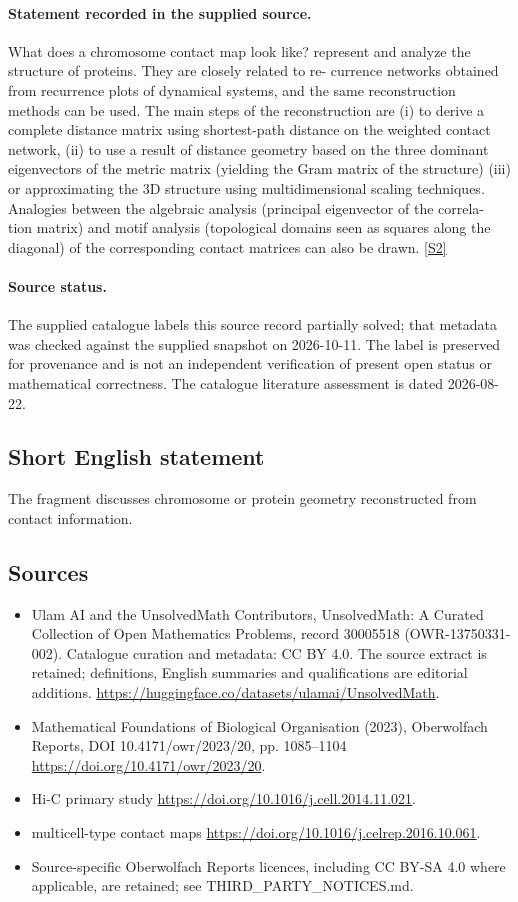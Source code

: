 \documentclass[11pt]{article}
\newcommand{\sref}[2]{\hyperlink{source:#1:#2}{[S#2]}}
\begin{document}
\paragraph{Statement recorded in the supplied source.}
What does a chromosome contact map look like? represent and analyze the structure of proteins. They are closely related to re- currence networks obtained from recurrence plots of dynamical systems, and the same reconstruction methods can be used. The main steps of the reconstruction are (i) to derive a complete distance matrix using shortest-path distance on the weighted contact network, (ii) to use a result of distance geometry based on the three dominant eigenvectors of the metric matrix (yielding the Gram matrix of the structure) (iii) or approximating the 3D structure using multidimensional scaling techniques. Analogies between the algebraic analysis (principal eigenvector of the correla- tion matrix) and motif analysis (topological domains seen as squares along the diagonal) of the corresponding contact matrices can also be drawn. \sref{30005518}{2}
\paragraph{Source status.}
The supplied catalogue labels this source record partially solved; that metadata was checked against the supplied snapshot on 2026-10-11. The label is preserved for provenance and is not an independent verification of present open status or mathematical correctness. The catalogue literature assessment is dated 2026-08-22.
\subsection{Short English statement}
The fragment discusses chromosome or protein geometry reconstructed from contact information.
\subsection{Sources}
\begin{itemize}
\item[\hypertarget{source:30005518:1}{S1}] Ulam AI and the UnsolvedMath Contributors, UnsolvedMath: A Curated Collection of Open Mathematics Problems, record 30005518 (OWR-13750331-002). Catalogue curation and metadata: CC BY 4.0. The source extract is retained; definitions, English summaries and qualifications are editorial additions.
\url{https://huggingface.co/datasets/ulamai/UnsolvedMath}.
\item[\hypertarget{source:30005518:2}{S2}] Mathematical Foundations of Biological Organisation (2023), Oberwolfach Reports, DOI 10.4171/owr/2023/20, pp. 1085--1104
\url{https://doi.org/10.4171/owr/2023/20}.
\item[\hypertarget{source:30005518:3}{S3}] Hi-C primary study
\url{https://doi.org/10.1016/j.cell.2014.11.021}.
\item[\hypertarget{source:30005518:4}{S4}] multicell-type contact maps
\url{https://doi.org/10.1016/j.celrep.2016.10.061}.
\item Source-specific Oberwolfach Reports licences, including CC BY-SA 4.0 where applicable, are retained; see THIRD\_PARTY\_NOTICES.md.
\end{itemize}
\end{document}

